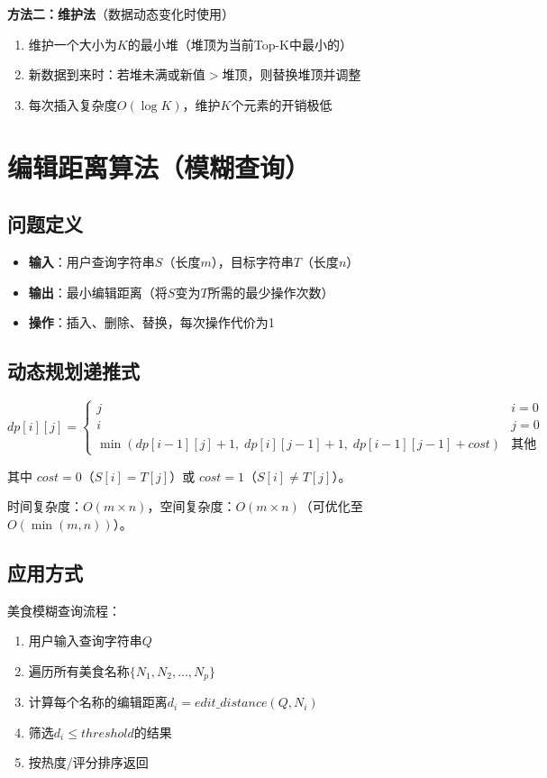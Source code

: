 \documentclass[12pt,a4paper]{report}
\begin{document}
\textbf{方法二：维护法}（数据动态变化时使用）
\begin{enumerate}
    \item 维护一个大小为$K$的最小堆（堆顶为当前Top-K中最小的）
    \item 新数据到来时：若堆未满或新值$>$堆顶，则替换堆顶并调整
    \item 每次插入复杂度$O(\log K)$，维护$K$个元素的开销极低
\end{enumerate}


\section{编辑距离算法（模糊查询）}

\subsection{问题定义}

\begin{itemize}
    \item \textbf{输入}：用户查询字符串$S$（长度$m$），目标字符串$T$（长度$n$）
    \item \textbf{输出}：最小编辑距离（将$S$变为$T$所需的最少操作次数）
    \item \textbf{操作}：插入、删除、替换，每次操作代价为1
\end{itemize}

\subsection{动态规划递推式}

$$
dp[i][j] = \begin{cases}
    j & i = 0 \\
    i & j = 0 \\
    \min(dp[i-1][j]+1,\; dp[i][j-1]+1,\; dp[i-1][j-1]+cost) & \text{其他}
\end{cases}
$$

其中 $cost = 0$（$S[i]=T[j]$）或 $cost = 1$（$S[i] \neq T[j]$）。

时间复杂度：$O(m \times n)$，空间复杂度：$O(m \times n)$（可优化至$O(\min(m, n))$）。

\subsection{应用方式}

美食模糊查询流程：
\begin{enumerate}
    \item 用户输入查询字符串$Q$
    \item 遍历所有美食名称$\{N_1, N_2, \ldots, N_p\}$
    \item 计算每个名称的编辑距离$d_i = edit\_distance(Q, N_i)$
    \item 筛选$d_i \leq threshold$的结果
    \item 按热度/评分排序返回
\end{enumerate}
\end{document}
